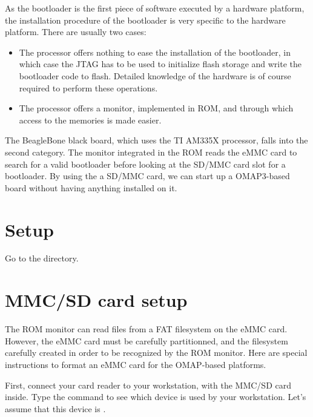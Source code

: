 
As the bootloader is the first piece of software executed by a
hardware platform, the installation procedure of the bootloader is
very specific to the hardware platform. There are usually two cases:

\begin{itemize}

\item The processor offers nothing to ease the installation of the
  bootloader, in which case the JTAG has to be used to initialize
  flash storage and write the bootloader code to flash. Detailed
  knowledge of the hardware is of course required to perform these
  operations.

\item The processor offers a monitor, implemented in ROM, and through
  which access to the memories is made easier.

\end{itemize}
The BeagleBone black board, which uses the TI AM335X processor, falls into
the second category. The monitor integrated in the ROM reads the eMMC
card to search for a valid bootloader before looking at the SD/MMC card slot
for a bootloader. By using the a SD/MMC card, we can
start up a OMAP3-based board without having anything installed on it.

\section{Setup}

Go to the  directory.

\section{MMC/SD card setup}

The ROM monitor can read files from a FAT filesystem on the eMMC
card. However, the eMMC card must be carefully partitionned, and the
filesystem carefully created in order to be recognized by the ROM
monitor. Here are special instructions to format an eMMC card
for the OMAP-based platforms.

First, connect your card reader to your workstation, with the MMC/SD
card inside. Type the  command to see which device is used
by your workstation. Let's assume that this device is .

